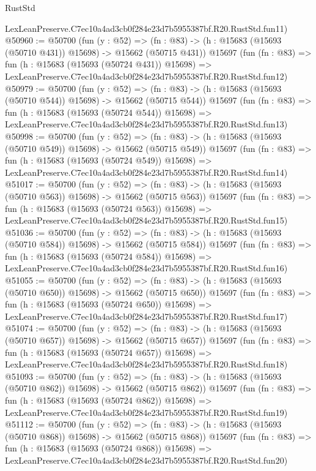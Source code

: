 \begin{lexlean}{RustStd}
\begin{coremodule}
    LexLeanPreserve.C7ec10a4ad3cb0f284e23d7b5955387bf.R20.RustStd.fun11)
@50960 := @50700
    (fun (y : @52) =>
    (fn : @83) -> (h : @15683 (@15693 (@50710 @431)) @15698) -> @15662 (@50715 @431))
    @15697
    (fun (fn : @83) =>
    fun (h : @15683 (@15693 (@50724 @431)) @15698) =>
    LexLeanPreserve.C7ec10a4ad3cb0f284e23d7b5955387bf.R20.RustStd.fun12)
@50979 := @50700
    (fun (y : @52) =>
    (fn : @83) -> (h : @15683 (@15693 (@50710 @544)) @15698) -> @15662 (@50715 @544))
    @15697
    (fun (fn : @83) =>
    fun (h : @15683 (@15693 (@50724 @544)) @15698) =>
    LexLeanPreserve.C7ec10a4ad3cb0f284e23d7b5955387bf.R20.RustStd.fun13)
@50998 := @50700
    (fun (y : @52) =>
    (fn : @83) -> (h : @15683 (@15693 (@50710 @549)) @15698) -> @15662 (@50715 @549))
    @15697
    (fun (fn : @83) =>
    fun (h : @15683 (@15693 (@50724 @549)) @15698) =>
    LexLeanPreserve.C7ec10a4ad3cb0f284e23d7b5955387bf.R20.RustStd.fun14)
@51017 := @50700
    (fun (y : @52) =>
    (fn : @83) -> (h : @15683 (@15693 (@50710 @563)) @15698) -> @15662 (@50715 @563))
    @15697
    (fun (fn : @83) =>
    fun (h : @15683 (@15693 (@50724 @563)) @15698) =>
    LexLeanPreserve.C7ec10a4ad3cb0f284e23d7b5955387bf.R20.RustStd.fun15)
@51036 := @50700
    (fun (y : @52) =>
    (fn : @83) -> (h : @15683 (@15693 (@50710 @584)) @15698) -> @15662 (@50715 @584))
    @15697
    (fun (fn : @83) =>
    fun (h : @15683 (@15693 (@50724 @584)) @15698) =>
    LexLeanPreserve.C7ec10a4ad3cb0f284e23d7b5955387bf.R20.RustStd.fun16)
@51055 := @50700
    (fun (y : @52) =>
    (fn : @83) -> (h : @15683 (@15693 (@50710 @650)) @15698) -> @15662 (@50715 @650))
    @15697
    (fun (fn : @83) =>
    fun (h : @15683 (@15693 (@50724 @650)) @15698) =>
    LexLeanPreserve.C7ec10a4ad3cb0f284e23d7b5955387bf.R20.RustStd.fun17)
@51074 := @50700
    (fun (y : @52) =>
    (fn : @83) -> (h : @15683 (@15693 (@50710 @657)) @15698) -> @15662 (@50715 @657))
    @15697
    (fun (fn : @83) =>
    fun (h : @15683 (@15693 (@50724 @657)) @15698) =>
    LexLeanPreserve.C7ec10a4ad3cb0f284e23d7b5955387bf.R20.RustStd.fun18)
@51093 := @50700
    (fun (y : @52) =>
    (fn : @83) -> (h : @15683 (@15693 (@50710 @862)) @15698) -> @15662 (@50715 @862))
    @15697
    (fun (fn : @83) =>
    fun (h : @15683 (@15693 (@50724 @862)) @15698) =>
    LexLeanPreserve.C7ec10a4ad3cb0f284e23d7b5955387bf.R20.RustStd.fun19)
@51112 := @50700
    (fun (y : @52) =>
    (fn : @83) -> (h : @15683 (@15693 (@50710 @868)) @15698) -> @15662 (@50715 @868))
    @15697
    (fun (fn : @83) =>
    fun (h : @15683 (@15693 (@50724 @868)) @15698) =>
    LexLeanPreserve.C7ec10a4ad3cb0f284e23d7b5955387bf.R20.RustStd.fun20)

\end{coremodule}
\end{lexlean}

